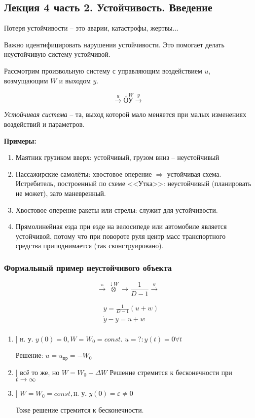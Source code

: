 \documentclass[main.tex]{subfiles}
\begin{document}
\subsection{Лекция 4 часть 2. Устойчивость. Введение}

Потеря устойчивости -- это аварии, катастрофы, жертвы...

Важно идентифицировать нарушения устойчивости.
Это помогает делать неустойчивую систему устойчивой.

Рассмотрим произвольную систему с управляющим воздействием $u$, возмущающим $W$ и выходом $y$.

$$ \xrightarrow{u} \overset{\downarrow W}{\boxed{\text{ОУ}}} \xrightarrow{y} $$

\emph{Устойчивая система} -- та, выход которой мало меняется при малых изменениях воздействий и параметров.

\textbf{Примеры:}
\begin{enumerate}
    \item Маятник грузиком вверх: устойчивый, грузом вниз -- неустойчивый
    \item Пассажирские самолёты: хвостовое оперение $ \Rightarrow $ устойчивая схема.
    Истребитель, построенный по схеме <<Утка>>: неустойчивый (планировать не может), зато маневренный.
    \item Хвостовое оперение ракеты или стрелы: служит для устойчивости.
    \item Прямолинейная езда при езде на велосипеде или автомобиле является устойчивой, потому что при повороте руля центр масс транспортного средства приподнимается (так сконструировано).
\end{enumerate}

\subsubsection{Формальный пример неустойчивого объекта}

$$ \xrightarrow{u} \overset{\downarrow W}{\otimes} \rightarrow \boxed{\frac{1}{D-1}} \xrightarrow{y} $$

\begin{align*}
    & y = \frac{1}{D-1}(u+w) \\
    & \dot y - y = u + w \\
\end{align*}

\begin{enumerate}
    \item ] н. у. $y(0)=0, W=W_0=const$.
    $u=? : y(t)=0 \forall t$

    Решение: $ u = u_{\text{пр}} = - W_0 $

    \item ] всё то же, но $ W = W_0 + \Delta W $
    Решение стремится к бесконечности при $t \to \infty $

    \item ] $ W = W_0 = const, \text{н. у. } y(0) = \varepsilon \ne 0 $

    Тоже решение стремится к бесконечности.
\end{enumerate}
\end{document}
